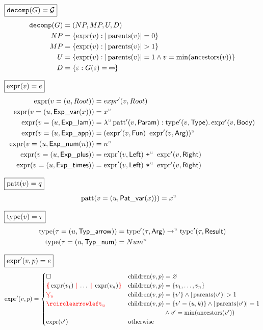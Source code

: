 \noindent $\boxed{\operatorname{\texttt{decomp}}\mathopen{}\left(G\right)\mathclose{} = \mathcal{G}}$
%
\begin{align*}
  \decomp{G} &= (NP, MP, U, D) \\
  NP &= \SetOf{\expr(v) \SuchThat{|\parents(v)| = 0}} \\
  MP &= \SetOf{\expr(v) \SuchThat{|\parents(v)| > 1}} \\
  U &= \SetOf{\expr(v) \SuchThat{|\parents(v)| = 1 \land v = \min(\ancestors(v))}} \\
  D &= \SetOf{\e \SuchThat{G(\e) = \Minus}}
\end{align*}

\noindent $\boxed{\operatorname{\text{expr}}(v) = e}$
%
\begin{align*}
  \expr(v=(u, Root)) &= expr'(v, Root) \\
  \expr(v=(u, \ExpVar(x))) &= x^{\id{u}} \\
  \expr(v=(u, \ExpLam)) &= \lambda^{\id{u}} \patt'(v, \LamParam) : \type'(v, \LamType) . \expr'(v, \LamBody) \\
  \expr(v=(u, \ExpApp)) &= (\expr'(v, \AppFun)~\expr'(v, \AppArg))^{\id{u}} \\
  \expr(v=(u, \ExpNum(n))) &= n^{\id{u}} \\
  \expr(v=(u, \ExpPlus)) &= \expr'(v, \PlusLeft)~\texttt{+}^{\id{u}}~\expr'(v, \PlusRight) \\
  \expr(v=(u, \ExpTimes)) &= \expr'(v, \TimesLeft)~\texttt{*}^{\id{u}}~\expr'(v, \TimesRight)
\end{align*}

\noindent $\boxed{\operatorname{\text{patt}}(v) = q}$
%
\begin{align*}
  \patt(v=(u, \PatVar(x))) &= x^{\id{u}}
\end{align*}

\noindent $\boxed{\operatorname{\text{type}}(v) = \tau}$
%
\begin{align*}
  \type(\tau=(u, \TypArrow)) &= \type'(\tau, \ArrowArg) \rightarrow^{\id{u}} \type'(\tau, \ArrowResult) \\
  \type(\tau=(u, \TypNum) &= Num^{\id{u}}
\end{align*}

\noindent $\boxed{\operatorname{\text{expr}}'(v, p) = e}$
%
\begin{align*}
  \expr'(v,p) = \begin{cases}
    \hole & \children(v,p) = \varnothing \\
    \conflictHole{\expr(v_1),\ldots,\expr(v_n)} & \children(v,p) = \SetOf{v_1, \ldots, v_n} \\
    \multiVertex{u} & \children(v,p) = \SetOf{v'} \land |\parents(v')| > 1 \\
    \cycleVertex{u} & \children(v,p) = \SetOf{v' = (u,k)} \land |\parents(v')| = 1 \\
        & \phantom{\children(v,p)} \land v' = \min(\ancestors(v')) \\
    \expr(v') & \text{otherwise} \\
  \end{cases}
\end{align*}

